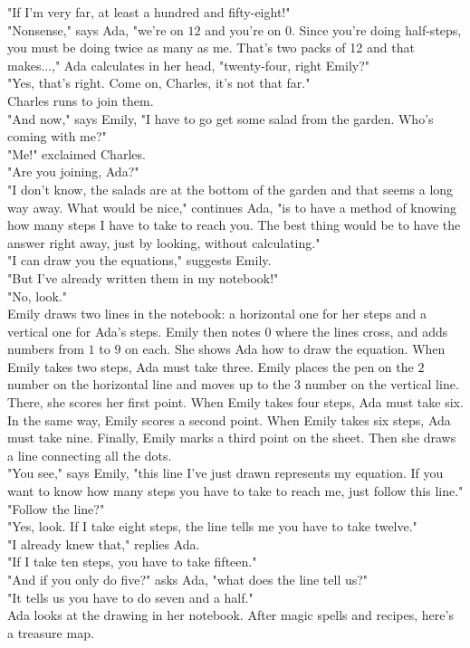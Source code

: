 "If I'm very far, at least a hundred and fifty-eight!"\\
"Nonsense," says Ada, "we're on $12$ and you're on $0$. Since you're doing half-steps, you must be doing twice as many as me. That's two packs of 12 and that makes...," Ada calculates in her head, "twenty-four, right Emily?"\\
"Yes, that's right. Come on, Charles, it's not that far."\\
Charles runs to join them. \\
"And now," says Emily, "I have to go get some salad from the garden. Who's coming with me?"\\
"Me!" exclaimed Charles.\\
"Are you joining, Ada?"\\
"I don't know, the salads are at the bottom of the garden and that seems a long way away. What would be nice," continues Ada, "is to have a method of knowing how many steps I have to take to reach you. The best thing would be to have the answer right away, just by looking, without calculating."\\
"I can draw you the equations," suggests Emily.\\
"But I've already written them in my notebook!"\\
"No, look."\\
Emily draws two lines in the notebook: a horizontal one for her steps and a vertical one for Ada's steps. Emily then notes $0$ where the lines cross, and adds numbers from $1$ to $9$ on each. She shows Ada how to draw the equation. When Emily takes two steps, Ada must take three. Emily places the pen on the $2$ number on the horizontal line and moves up to the $3$ number on the vertical line. There, she scores her first point. When Emily takes four steps, Ada must take six. In the same way, Emily scores a second point. When Emily takes six steps, Ada must take nine. Finally, Emily marks a third point on the sheet. Then she draws a line connecting all the dots.\\
"You see," says Emily, "this line I've just drawn represents my equation. If you want to know how many steps you have to take to reach me, just follow this line."\\
"Follow the line?"\\
"Yes, look. If I take eight steps, the line tells me you have to take twelve."\\
"I already knew that," replies Ada.\\
"If I take ten steps, you have to take fifteen."\\
"And if you only do five?" asks Ada, "what does the line tell us?"\\
"It tells us you have to do seven and a half."\\
Ada looks at the drawing in her notebook. After magic spells and recipes, here's a treasure map.
